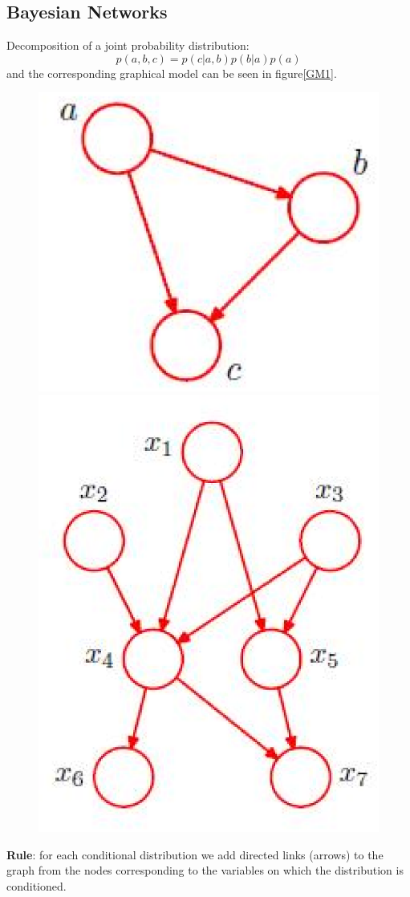 \documentclass[a4paper]{book}
\begin{document}
\subsection{Bayesian Networks}
Decomposition of a joint probability distribution:
\begin{equation}
    \tag{8.1} p(a, b, c) = p(c|a, b)p(b|a)p(a)
    \label{eq8.1}
\end{equation}
and the corresponding graphical model can be seen in figure\ref{GM1}.
\begin{figure}
\begin{minipage}{0.5\textwidth}
    \centering
    \includegraphics[width=0.5\linewidth]{./imgs/GM1.eps}
    \caption{}
    \label{GM1}
\end{minipage}
\begin{minipage}{0.5\textwidth}
    \centering
    \includegraphics[width=0.5\linewidth]{./imgs/GM2.eps}
    \caption{}
    \label{GM2}
\end{minipage}
\end{figure}
\newline
\textbf{Rule}: for each conditional distribution we add directed links (arrows) to the graph from the nodes corresponding to the variables on which the distribution is conditioned.
\end{document}
